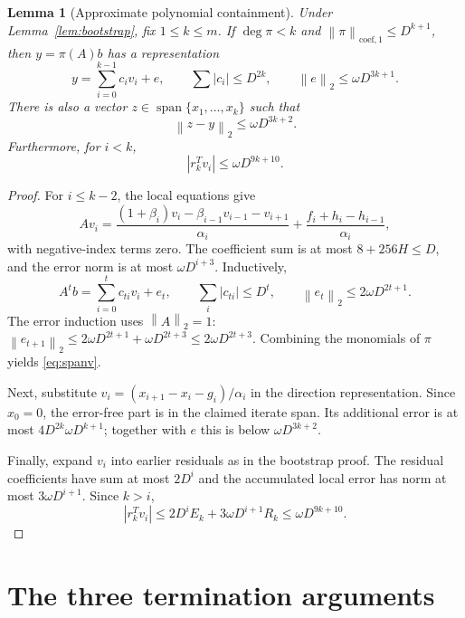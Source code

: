 \documentclass[11pt]{article}
\newtheorem{lemma}[theorem]{Lemma}
\theoremstyle{remark}\newtheorem{remark}[theorem]{Remark}
\newcommand{\norm}[1]{\left\lVert#1\right\rVert_2}
\newcommand{\spanof}{\operatorname{span}}
\newcommand{\coefnorm}[1]{\left\lVert#1\right\rVert_{\mathrm{coef},1}}
\begin{document}
\begin{lemma}[Approximate polynomial containment]\label{lem:span}
Under Lemma~\ref{lem:bootstrap}, fix $1\le k\le m$. If $\deg\pi<k$ and
$\coefnorm{\pi}\le D^{k+1}$, then $y=\pi(A)b$ has a representation
\begin{equation}\label{eq:spanv}
y=\sum_{i=0}^{k-1}c_i v_i+e,\qquad
\sum|c_i|\le D^{2k},\qquad\norm e\le\omega D^{3k+1}.
\end{equation}
There is also a vector $z\in\spanof\{x_1,\ldots,x_k\}$ such that
\begin{equation}\label{eq:spanx}
\norm{z-y}\le\omega D^{3k+2}.
\end{equation}
Furthermore, for $i<k$,
\begin{equation}\label{eq:rvorth}
|r_k^Tv_i|\le\omega D^{9k+10}.
\end{equation}
\end{lemma}
\begin{proof}
For $i\le k-2$, the local equations give
\begin{equation}\label{eq:Avspan}
Av_i=\frac{(1+\beta_i)v_i-\beta_{i-1}v_{i-1}-v_{i+1}}{\alpha_i}
+\frac{f_i+h_i-h_{i-1}}{\alpha_i},
\end{equation}
with negative-index terms zero. The coefficient sum is at most
$8+256H\le D$, and the error norm is at most $\omega D^{i+3}$.
Inductively,
\[
A^t b=\sum_{i=0}^t c_{ti}v_i+e_t,\qquad
\sum_i|c_{ti}|\le D^t,\qquad
\norm{e_t}\le2\omega D^{2t+1}.
\]
The error induction uses $\norm A=1$:
$\norm{e_{t+1}}\le2\omega D^{2t+1}+\omega D^{2t+3}
\le2\omega D^{2t+3}$.
Combining the monomials of $\pi$ yields \eqref{eq:spanv}.

Next, substitute
$v_i=(x_{i+1}-x_i-g_i)/\alpha_i$ in the direction representation.
Since $x_0=0$, the error-free part is in the claimed iterate span. Its
additional error is at most
$4D^{2k}\omega D^{k+1}$; together with $e$ this is below
$\omega D^{3k+2}$.

Finally, expand $v_i$ into earlier residuals as in the bootstrap proof.
The residual coefficients have sum at most $2D^i$ and the accumulated
local error has norm at most $3\omega D^{i+1}$. Since $k>i$,
\[
|r_k^Tv_i|\le2D^i E_k+3\omega D^{i+1}R_k
\le\omega D^{9k+10}.
\]
\end{proof}

\section{The three termination arguments}
\label{sec:mainupper}
\end{document}
